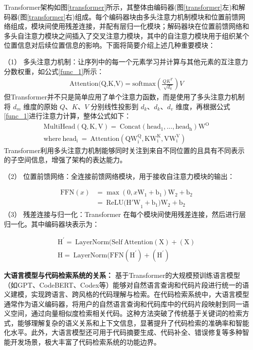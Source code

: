 \documentclass[UTF8,a4paper,12pt]{ctexart}
\numberwithin{equation}{section}
\begin{document}
Transformer架构如图\ref{transformer}所示，其整体由编码器(图\ref{transformer}左)和解码器(图\ref{transformer}右)组成。每个编码器块由多头注意力机制模块和位置前馈网络组成，模块间使用残差连接，并配有层归一化模块；解码器块在位置前馈网络和多头自注意力模块之间插入了交叉注意力模块，其中的自注意力模块用于组织某个位置信息对后续位置信息的影响。下面将简要介绍上述几种重要模块：\par
（1） 多头注意力机制：让序列中的每一个元素学习并计算与其他元素的互注意力分数权重，如公式\ref{func_1}所示：
\begin{eqnarray}
	\text{Attention(Q,K,V)} =  \text{softmax}(\frac{QK^T}{\sqrt[]{d_k}})V
	\label{func_1}
\end{eqnarray}
但Transformer并不只是简单应用了单个注意力函数，而是使用了多头注意力机制将 \(d_m\) 维度的原始 \(Q\)、\(K\)、\(V\) 分别线性投影到 \(d_k\)、\(d_k\)、\(d_v\) 维度，再根据公式\ref{func_1}进行注意力计算，整体公式如下：
\begin{eqnarray}
	\mathrm{MultiHead(Q,K,V)=~Concat(head_{1},...,head_{h})W^{O}} \\
	\mathrm{where~head_{i}~=~Attention(QW_{i}^{Q},KW_{i}^{K},VW_{i}^{V})}
	\label{func_2}
\end{eqnarray}
Transformer利用多头注意力机制能够同时关注到来自不同位置的且具有不同表示的子空间信息，增强了架构的表达能力。\par
（2） 位置前馈网络：全连接前馈网络模块，用于接收自注意力模块的输出：\par
\begin{eqnarray}
	\mathrm{FFN}(x) & =\max(0,x\mathrm{W}_1+\mathrm{b}_1)\mathrm{W}_2+\mathrm{b}_2 \\
	& =\mathrm{~ReLU(H'W}_1+\mathrm{b}_1)\mathrm{W}_2+\mathrm{b}_2
	\label{func_3}
\end{eqnarray}
（3） 残差连接与归一化：Transformer 在每个模块间使用残差连接，然后进行层归一化。其中编码器块表示为：\par
\begin{eqnarray}
	\mathrm{H^{\prime}=~LayerNorm(Self~Attention(X)+(X)} \\
	\mathrm{H=~LayerNorm(FFN(H^{\prime})+(H^{\prime})}
	\label{func_4}
\end{eqnarray}

\textbf{大语言模型与代码检索系统的关系：}  
基于Transformer的大规模预训练语言模型（如GPT、CodeBERT、Codex等）能够对自然语言查询和代码片段进行统一的语义建模，实现跨语言、跨风格的代码理解与检索。在代码检索系统中，大语言模型通常作为语义编码器，将用户的自然语言查询和代码库中的代码片段映射到同一语义空间，通过向量相似度检索相关代码。这种方法突破了传统基于关键词的检索方式，能够理解复杂的语义关系和上下文信息，显著提升了代码检索的准确率和智能化水平。此外，大语言模型还可用于代码摘要生成、代码补全、错误修复等多种智能开发场景，极大丰富了代码检索系统的功能边界。
\end{document}
